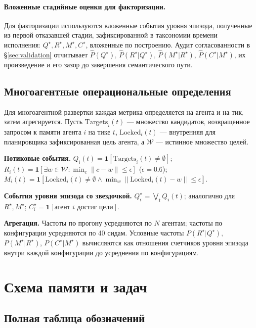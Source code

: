 \documentclass{article}
\begin{document}
\paragraph{Вложенные стадийные оценки для факторизации.}
Для факторизации используются вложенные события уровня эпизода, полученные из первой отказавшей стадии, зафиксированной в таксономии времени исполнения: $Q^\star, R^\star, M^\star, C^\star$, вложенные по построению. Аудит согласованности в \S\ref{sec:validation} отчитывает $\hat P(Q^\star)$, $\hat P(R^\star|Q^\star)$, $\hat P(M^\star|R^\star)$, $\hat P(C^\star|M^\star)$, их произведение и его зазор до завершения семантического пути.

\subsection{Многоагентные операциональные определения}
\label{app:multi-agent-defs}

Для многоагентной развертки каждая метрика определяется на агента и на тик, затем агрегируется. Пусть $\mathrm{Targets}_i(t)$ --- множество кандидатов, возвращенное запросом к памяти агента $i$ на тике $t$, $\mathrm{Locked}_i(t)$ --- внутренняя для планировщика зафиксированная цель агента, а $\mathcal{W}$ --- истинное множество целей.

\textbf{Потиковые события.} $Q_i(t) = \mathbf{1}[\mathrm{Targets}_i(t) \ne \emptyset]$; $R_i(t) = \mathbf{1}[\exists w \in \mathcal{W}: \min_{c}\|c - w\| \le \epsilon]$ ($\epsilon = 0.6$); $M_i(t) = \mathbf{1}[\mathrm{Locked}_i(t) \ne \emptyset \land \min_w\|\mathrm{Locked}_i(t) - w\| \le \epsilon]$.

\textbf{События уровня эпизода со звездочкой.} $Q^\star_i = \bigvee_t Q_i(t)$; аналогично для $R^\star, M^\star$; $C^\star_i = \mathbf{1}[\text{агент } i \text{ достиг цели}]$.

\textbf{Агрегация.} Частоты по прогону усредняются по $N$ агентам; частоты по конфигурации усредняются по 40 сидам. Условные частоты $P(R^\star|Q^\star)$, $P(M^\star|R^\star)$, $P(C^\star|M^\star)$ вычисляются как отношения счетчиков уровня эпизода внутри каждой конфигурации до усреднения по конфигурациям.

\section{Схема памяти и задач}
\label{app:schemas}

\subsection{Полная таблица обозначений}
\label{app:notation}
\end{document}
